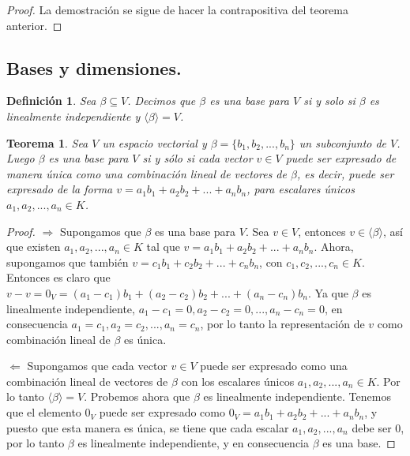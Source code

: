 \documentclass{book}
\newtheorem{theorem}{Teorema}
\newtheorem{definition}{Definición}
\begin{document}
\begin{proof}
La demostración se sigue de hacer la contrapositiva del teorema anterior.
\end{proof}

\subsection{Bases y dimensiones.}

\begin{definition}
Sea $\beta \subseteq V$. Decimos que $\beta$ es una base para $V$ si y solo si $\beta$ es linealmente independiente y $\langle \beta \rangle=V$.
\end{definition}

\begin{theorem}

Sea $V$ un espacio vectorial y $\beta = \{b_1, b_2,...,b_n\}$ un subconjunto de $V$. Luego $\beta$ es una base para $V$ si y sólo si cada vector $v \in V$ puede ser expresado de manera única como una combinación lineal de vectores de $\beta$, es decir, puede ser expresado de la forma $v = a_1 b_1 + a_2 b_2 + ...+ a_n b_n$, para escalares únicos $a_1, a_2, ..., a_n \in K$.

\end{theorem}

\begin{proof}

$\Rightarrow$ Supongamos que $\beta$ es una base para $V$. Sea $v \in V$, entonces $v \in \langle \beta \rangle$, así que existen $a_1, a_2, ..., a_n \in K$ tal que $v = a_1 b_1 + a_2 b_2 + ...+ a_n b_n$. Ahora, supongamos que también $v = c_1 b_1 + c_2 b_2 + ...+ c_n b_n$, con $c_1,c_2,...,c_n \in K$. Entonces es claro que $v-v=0_V=(a_1 - c_1)b_1+(a_2 -c_2)b_2 +...+(a_n -c_n)b_n$. Ya que $\beta$ es linealmente independiente, $a_1 -c_1=0, a_2 -c_2=0, ..., a_n -c_n=0$, en consecuencia $a_1=c_1, a_2 =c_2, ..., a_n =c_n$, por lo tanto la representación de $v$ como combinación lineal de $\beta$ es única.\newline

$\Leftarrow$ Supongamos que cada vector $v \in V$ puede ser expresado como una combinación lineal de vectores de $\beta$ con los escalares únicos $a_1, a_2, ..., a_n \in K$. Por lo tanto $\langle \beta \rangle=V$. Probemos ahora que $\beta$ es linealmente independiente. Tenemos que el elemento $0_V$ puede ser expresado como $0_V=a_1b_1+a_2b_2+...+a_nb_n$, y puesto que esta manera es única, se tiene que cada escalar $a_1, a_2, ..., a_n$ debe ser $0$, por lo tanto $\beta$ es linealmente independiente, y en consecuencia $\beta$ es una base.

\end{proof}
\end{document}
